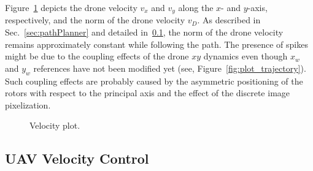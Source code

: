 Figure~\ref{fig:plot_velocity} depicts the drone velocity $v_x$ and $v_y$ along the $x$- and $y$-axis, respectively, and the norm of the drone velocity $v_D$. As described in Sec.~\ref{sec:pathPlanner} and detailed in~\ref{subsec:uavVelocity}, the norm of the drone velocity remains approximately constant while following the path. The presence of spikes might be due to the coupling effects of the drone $xy$ dynamics even though $x_w$ and $y_w$ references have not been modified yet (see, Figure~\ref{fig:plot_trajectory}). Such coupling effects are probably caused by the asymmetric positioning of the rotors with respect to the principal axis and the effect of the discrete image pixelization. 
%
\begin{figure}
	\begin{center}
	\end{center}
	\caption{Velocity plot.}
	\label{fig:plot_velocity}
\end{figure}

\subsection{UAV Velocity Control}
\label{subsec:uavVelocity}

